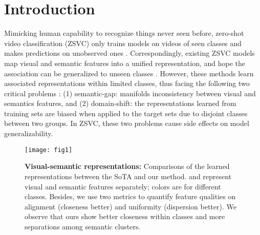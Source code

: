 \documentclass[10pt,twocolumn,letterpaper]{article}
\newlength\figsep\setlength{\figsep}{-2.8ex}
\begin{document}
\section{Introduction}
Mimicking human capability to recognize things never seen before, zero-shot video classification (ZSVC) only trains models on videos of seen classes and makes predictions on unobserved ones \cite{liu2011recognizing,vgan,multi,mettes2017spatial,mettes2021object,gao2020learning,kim2021daszl,zhu2018towards}.
Correspondingly, existing ZSVC models map visual and semantic features into a unified representation, and hope the association can be generalized to unseen classes \cite{zhu2018towards,hahn2019action2vec,bishay2019tarn,brattoli2020rethinking,qiu2021boosting,chen2021elaborative}.
However, these methods learn associated representations within limited classes, thus facing the following two critical problems \cite{fu2015transductive,gao2020learning}:
(1) semantic-gap: manifolds inconsistency between visual and semantics features, and 
(2) domain-shift: the representations learned from training sets are biased when applied to the target sets due to disjoint classes between two groups.
In ZSVC, these two problems cause side effects on model generalizability.

\begin{figure}
    \centering
    \texttt{[image: fig1]}
    \caption{
             {\bf Visual-semantic representations:} Comparisons of the learned representations between the SoTA \cite{brattoli2020rethinking} and our method.
             \protect\scalebox{1}{\textbullet} and \protect represent visual and semantic features separately; colors are for different classes.
             Besides, we use two metrics to quantify feature qualities on alignment (closeness better) and uniformity (dispersion better).
             We observe that ours show better closeness within classes and more separations among semantic clusters.}
    \label{fig:fig1}
    \vspace{\figsep}
\end{figure}
\end{document}
